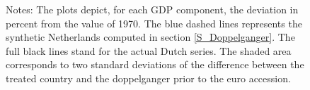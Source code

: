 \documentclass[12pt]{article}
\newcommand{\annote}[1]{\parbox{\textwidth}{\renewcommand{\baselinestretch}{1.0}\vspace{12pt} \small Notes: #1}}
\begin{document}
\begin{appendices}
\begin{figure}[h!]
    \annote{The plots depict, for each GDP component, the deviation in percent from the value of 1970. The blue dashed lines represents the synthetic Netherlands computed in section \ref{S_Doppelganger}. The full black lines stand for the actual Dutch series. The shaded area corresponds to two standard deviations of the difference between the treated country and the doppelganger prior to the euro accession.}
\end{figure}


\end{appendices}
\end{document}

